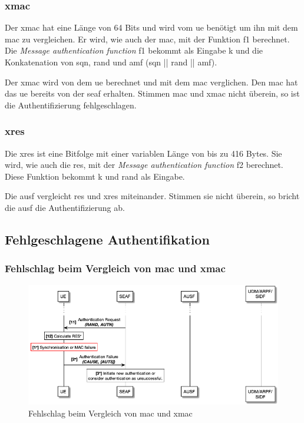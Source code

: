 \subsubsection{\gls{xmac}}
Der \gls{xmac} hat eine Länge von 64 Bits und wird vom \gls{ue} benötigt um ihn mit dem \gls{mac} zu vergleichen.
Er wird, wie auch der \gls{mac}, mit der Funktion f1 berechnet. %
Die \textit{Message authentication function} f1 bekommt als Eingabe \gls{k} und die Konkatenation von \gls{sqn}, \gls{rand} und \gls{amf} (\gls{sqn} || \gls{rand} || \gls{amf}). %

Der \gls{xmac} wird von dem \gls{ue} berechnet und mit dem \gls{mac} verglichen. 
Den \gls{mac} hat das \gls{ue} bereits von der \gls{seaf} erhalten.
Stimmen \gls{mac} und \gls{xmac} nicht überein, so ist die Authentifizierung fehlgeschlagen. %

\subsubsection{\gls{xres}}
Die \gls{xres} ist eine Bitfolge mit einer variablen Länge von bis zu 416 Bytes. %
Sie wird, wie auch die \gls{res}, mit der \textit{Message authentication function} f2 berechnet. 
Diese Funktion bekommt \gls{k} und \gls{rand} als Eingabe. %

Die \gls{ausf} vergleicht \gls{res} und \gls{xres} miteinander.
Stimmen sie nicht überein, so bricht die \gls{ausf} die Authentifizierung ab. %


\subsection{Fehlgeschlagene Authentifikation}

\subsubsection{Fehlschlag beim Vergleich von \gls{mac} und \gls{xmac}}

\begin{figure}[H]
  \centering
  \includegraphics[width=\textwidth]{uml/protocol_mac_failure_v1.png}
  \caption{Fehlschlag beim Vergleich von \gls{mac} und \gls{xmac}}
  \label{fig:protocol_mac_failure_v1}
\end{figure}

